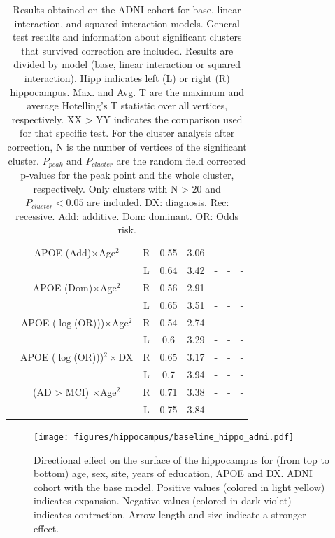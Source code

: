 \begin{table}[htbp]
{\begin{tabular}{@{}c|c||ccc||ccc@{}}
&  APOE (Add)$\times$Age$^2$ &    R &   0.55 &   3.06 &  - & - & - \\ 
&                         &    L &    0.64 &   3.42  &  - & - & - \\ 
& APOE (Dom)$\times$Age$^2$ &    R &   0.56 &   2.91   &  - & - & - \\ 
&                        &    L &    0.65 &   3.51 & - & - & - \\ 
& APOE ($\log$(OR)))$\times$Age$^2$ &    R & 0.54 & 2.74 &  - & - & - \\ 
&                        &    L & 0.6  & 3.29  & - & - & - \\ 
& APOE ($\log$(OR)))$^2\times$DX &  R & 0.65 & 3.17 &  - & - & - \\ 
&                        &    L & 0.7  & 3.94 & - & - & - \\ 
& (AD > MCI) $\times$Age$^2$ &    R &   0.71 &  3.38   &  - & - & - \\ 
&                          &    L &    0.75 &   3.84 & - &  - & - \\  \bottomrule
 \bottomrule
\end{tabular}}
\caption[Results obtained on the ADNI cohort for base, linear interaction, and squared interaction models.]{\small Results obtained on the ADNI cohort for base, linear interaction, and squared interaction models. General test results and information about significant clusters that survived correction are included. Results are divided by model (base, linear interaction or squared interaction). Hipp indicates left (L) or right (R) hippocampus. Max. and Avg. T are the maximum and average Hotelling's T statistic over all vertices, respectively. XX > YY indicates the comparison used for that specific test. For the cluster analysis after correction, N is the number of vertices of the significant cluster. $P_{peak}$ and $P_{cluster}$ are the random field corrected p-values for the peak point and the whole cluster, respectively. Only  clusters with N > 20 and $P_{cluster} < 0.05$ are included. DX: diagnosis. Rec: recessive. Add: additive. Dom: dominant. OR: Odds risk.}\label{table:fullADNItable}
\end{table}

\begin{figure}[htbp]
  \centering
  \texttt{[image: figures/hippocampus/baseline\_hippo\_adni.pdf]}
  \caption[Directional effect on the surface of the hippocampus, ADNI cohort.]{Directional effect on the surface of the hippocampus for (from top to bottom) age, sex, site, years of education, APOE and DX. ADNI cohort with the base model. Positive values (colored in light yellow) indicates expansion. Negative values (colored in dark violet) indicates contraction. Arrow length and size indicate a stronger effect.}\label{fig:adnibaselinefig1}
\end{figure}

